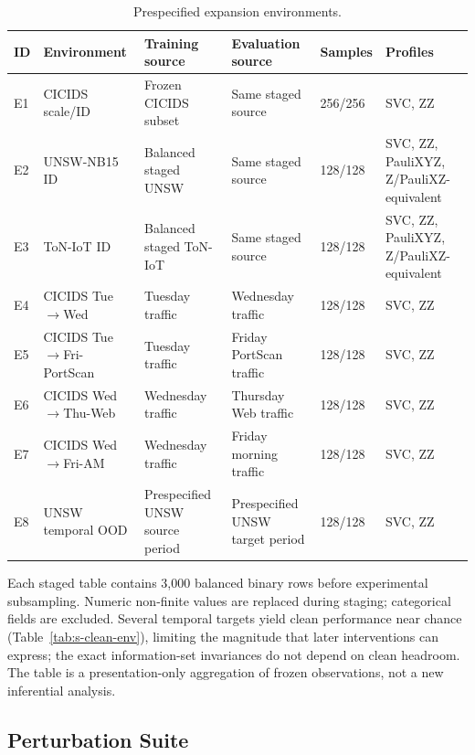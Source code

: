 \documentclass[10pt,journal,compsoc]{IEEEtran}
\begin{document}
\begin{table}[!t]
\caption{Prespecified expansion environments.}
\label{tab:env}
\centering
\footnotesize
\begin{tabularx}{\textwidth}{@{}p{}p{}p{}p{}YY@{}}
\toprule
ID & Environment & Training source & Evaluation source & Samples & Profiles \\
\midrule
E1 & CICIDS scale/ID & Frozen CICIDS subset & Same staged source & 256/256 & SVC, ZZ \\
E2 & UNSW-NB15 ID & Balanced staged UNSW & Same staged source & 128/128 & SVC, ZZ, PauliXYZ, Z/PauliXZ-equivalent \\
E3 & ToN-IoT ID & Balanced staged ToN-IoT & Same staged source & 128/128 & SVC, ZZ, PauliXYZ, Z/PauliXZ-equivalent \\
E4 & CICIDS Tue$\rightarrow$Wed & Tuesday traffic & Wednesday traffic & 128/128 & SVC, ZZ \\
E5 & CICIDS Tue$\rightarrow$Fri-PortScan & Tuesday traffic & Friday PortScan traffic & 128/128 & SVC, ZZ \\
E6 & CICIDS Wed$\rightarrow$Thu-Web & Wednesday traffic & Thursday Web traffic & 128/128 & SVC, ZZ \\
E7 & CICIDS Wed$\rightarrow$Fri-AM & Wednesday traffic & Friday morning traffic & 128/128 & SVC, ZZ \\
E8 & UNSW temporal OOD & Prespecified UNSW source period & Prespecified UNSW target period & 128/128 & SVC, ZZ \\
\bottomrule
\end{tabularx}
\end{table}



Each staged table contains 3,000 balanced binary rows before experimental
subsampling. Numeric non-finite values are replaced during staging;
categorical fields are excluded. Several temporal targets yield clean
performance near chance (Table~\ref{tab:s-clean-env}), limiting the magnitude
that later interventions can express; the exact information-set invariances do
not depend on clean headroom. The table is a presentation-only aggregation of
frozen observations, not a new inferential analysis.

\subsection{Perturbation Suite}
\end{document}
